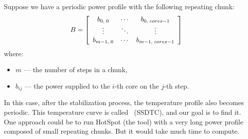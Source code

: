 Suppose we have a periodic power profile with the following repeating chunk:
\[
  B = \left[
    \begin{array}{ccc}
      b_{0,\;0} & \cdots & b_{0,\;cores-1} \\
      \vdots & \ddots & \vdots \\
      b_{m-1,\;0} & \cdots & b_{m-1,\;cores-1}
    \end{array}
  \right]
\]
where:
\begin{itemize}
  \item $m$ --- the number of steps in a chunk,
  \item $b_{ij}$ --- the power supplied to the $i$-th core on the $j$-th step.
\end{itemize}

In this case, after the stabilization process, the temperature profile also becomes periodic. This temperature curve is called \ssdtc\ (SSDTC), and our goal is to find it. One approach could be to run HotSpot (the tool) with a very long power profile composed of small repeating chunks. But it would take much time to compute.
